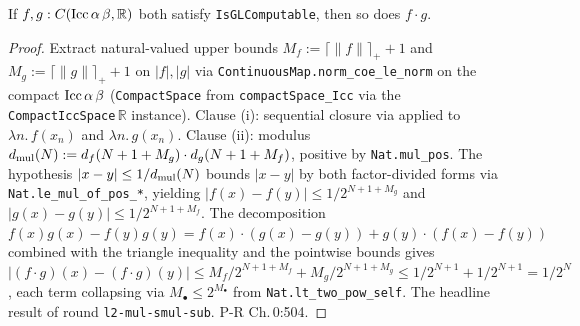 \begin{lemma}
  \label{lem:l2_mul_gl}
  \leanok
  If $f, g : C(\textnormal{Icc}\,\alpha\,\beta, \mathbb{R})$ both satisfy \texttt{IsGLComputable}, then so does $f \cdot g$.
\end{lemma}
\begin{proof}\leanok
  Extract natural-valued upper bounds $M_f := \lceil \|f\| \rceil_+ + 1$ and $M_g := \lceil \|g\| \rceil_+ + 1$ on $|f|, |g|$ via \texttt{ContinuousMap.norm\_coe\_le\_norm} on the compact $\textnormal{Icc}\,\alpha\,\beta$ (\texttt{CompactSpace} from \texttt{compactSpace\_Icc} via the \texttt{CompactIccSpace}\,$\mathbb{R}$ instance). Clause (i): sequential closure via  applied to $\lambda n.\,f(x_n)$ and $\lambda n.\,g(x_n)$. Clause (ii): modulus $d_{\textnormal{mul}}(N) := d_f(N + 1 + M_g) \cdot d_g(N + 1 + M_f)$, positive by \texttt{Nat.mul\_pos}. The hypothesis $|x-y| \le 1/d_{\textnormal{mul}}(N)$ bounds $|x-y|$ by both factor-divided forms via \texttt{Nat.le\_mul\_of\_pos\_*}, yielding $|f(x)-f(y)| \le 1/2^{N+1+M_g}$ and $|g(x)-g(y)| \le 1/2^{N+1+M_f}$. The decomposition $f(x)g(x) - f(y)g(y) = f(x) \cdot (g(x) - g(y)) + g(y) \cdot (f(x) - f(y))$ combined with the triangle inequality and the pointwise bounds gives $|(f \cdot g)(x) - (f \cdot g)(y)| \le M_f/2^{N+1+M_f} + M_g/2^{N+1+M_g} \le 1/2^{N+1} + 1/2^{N+1} = 1/2^N$, each term collapsing via $M_\bullet \le 2^{M_\bullet}$ from \texttt{Nat.lt\_two\_pow\_self}. The headline result of round \texttt{l2-mul-smul-sub}. P-R Ch.\,0:504.
\end{proof}
